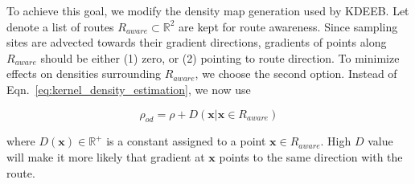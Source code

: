 To achieve this goal, we modify the density map generation used by KDEEB.
Let denote a list of routes $R_{aware} \subset \mathbb{R}^2$ are kept for route awareness.
Since sampling sites are advected towards their gradient directions, gradients of points along $R_{aware}$ should be either (1) zero, or (2) pointing to route direction.
To minimize effects on densities surrounding $R_{aware}$, we choose the second option.
Instead of Eqn.~\ref{eq:kernel_density_estimation}, we now use

\vspace{-5mm}
\begin{equation}\label{eq:new_density}
\rho_{od} = \rho + D(\textbf{x} | \textbf{x} \in R_{aware})
\end{equation}
\vspace{-3mm}

\noindent
where $D(\textbf{x}) \in \mathbb{R}^+$ is a constant assigned to a point $\textbf{x} \in R_{aware}$.
High $D$ value will make it more likely that gradient at $\textbf{x}$ points to the same direction with the route.
